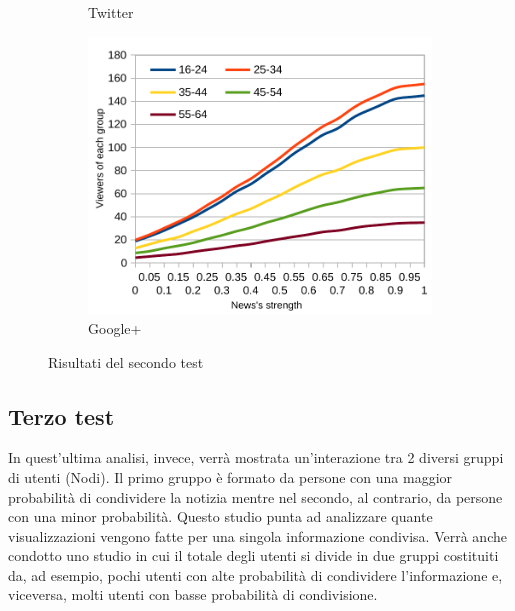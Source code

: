 \begin{figure}[!ht]
\begin{subfigure}[c]{0.32\textwidth}
\begin{center}
    \end{center}
    \vspace*{-10pt}
    \caption{Twitter}
    \label{img:result_test_2_tw}
  \end{subfigure}  
  \begin{subfigure}[r]{0.32\textwidth}
    \begin{center}
      \includegraphics[width=1\textwidth]{charts/second-test-gp.pdf}
    \end{center}
    \vspace*{-10pt}
    \caption{Google+}
    \label{img:result_test_2_gp}
  \end{subfigure}  
 \caption{Risultati del secondo test}
 \label{img:results_test_2}
\end{figure}



\subsection{Terzo test}
\label{section:third_test}

In quest'ultima analisi, invece, verrà mostrata un'interazione tra 2 diversi gruppi di utenti (Nodi).
Il primo gruppo è formato da persone con una maggior probabilità di condividere la notizia 
mentre nel secondo, al contrario, da persone con una minor probabilità.
Questo studio punta ad analizzare quante visualizzazioni vengono fatte per una singola informazione condivisa.
Verrà anche condotto uno studio in cui il totale degli utenti si divide in due gruppi costituiti da, ad esempio, 
pochi utenti con alte probabilità di condividere l'informazione e, viceversa, 
molti utenti con basse probabilità di condivisione.

